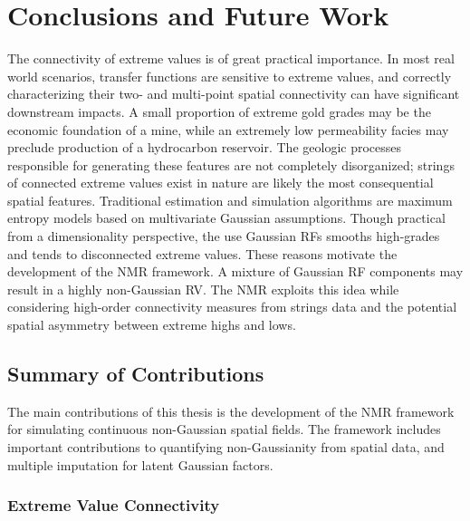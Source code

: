 
\chapter{Conclusions and Future Work}
\label{ch:07conclusions}

The connectivity of extreme values is of great practical importance. In most real world scenarios, transfer functions are sensitive to extreme values, and correctly characterizing their two- and multi-point spatial connectivity can have significant downstream impacts. A small proportion of extreme gold grades may be the economic foundation of a mine, while an extremely low permeability facies may preclude production of a hydrocarbon reservoir. The geologic processes responsible for generating these features are not completely disorganized; strings of connected extreme values exist in nature are likely the most consequential spatial features. Traditional estimation and simulation algorithms are maximum entropy models based on multivariate Gaussian assumptions. Though practical from a dimensionality perspective, the use Gaussian \glspl{RF} smooths high-grades and tends to disconnected extreme values. These reasons motivate the development of the \gls{NMR} framework. A mixture of Gaussian \gls{RF} components may result in a highly non-Gaussian \gls{RV}. The \gls{NMR} exploits this idea while considering high-order connectivity measures from strings data and the potential spatial asymmetry between extreme highs and lows.


\FloatBarrier
\section{Summary of Contributions}
\label{sec:07contrib}

The main contributions of this thesis is the development of the \gls{NMR} framework for simulating continuous non-Gaussian spatial fields. The framework includes important contributions to quantifying non-Gaussianity from spatial data, and multiple imputation for latent Gaussian factors.

\subsection{Extreme Value Connectivity}
\label{subsec:07connect}


